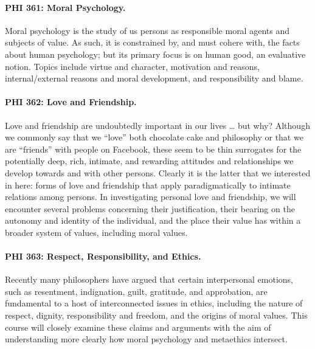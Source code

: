 \documentclass[11pt]{article}
\begin{document}
\paragraph{PHI 361: Moral Psychology.}

Moral psychology is the study of us persons as responsible moral agents and subjects of value. As such, it is constrained by, and must cohere with, the facts about human psychology; but its primary focus is on human good, an evaluative notion. Topics include virtue and character, motivation and reasons, internal/external reasons and moral development, and responsibility and blame.

\paragraph{PHI 362: Love and Friendship.}

Love and friendship are undoubtedly important in our lives \dots{} but why? Although we commonly say that we \enquote{love} both chocolate cake and philosophy or that we are \enquote{friends} with people on Facebook, these seem to be thin surrogates for the potentially deep, rich, intimate, and rewarding attitudes and relationships we develop towards and with other persons. Clearly it is the latter that we interested in here: forms of love and friendship that apply paradigmatically to intimate relations among persons. In investigating personal love and friendship, we will encounter several problems concerning their justification, their bearing on the autonomy and identity of the individual, and the place their value has within a broader system of values, including moral values.

\paragraph{PHI 363: Respect, Responsibility, and Ethics.}

Recently many philosophers have argued that certain interpersonal emotions, such as resentment, indignation, guilt, gratitude, and approbation, are fundamental to a host of interconnected issues in ethics, including the nature of respect, dignity, responsibility and freedom, and the origins of moral values. This course will closely examine these claims and arguments with the aim of understanding more clearly how moral psychology and metaethics intersect.

\ifdefined\HCode
\fi
\end{document}
